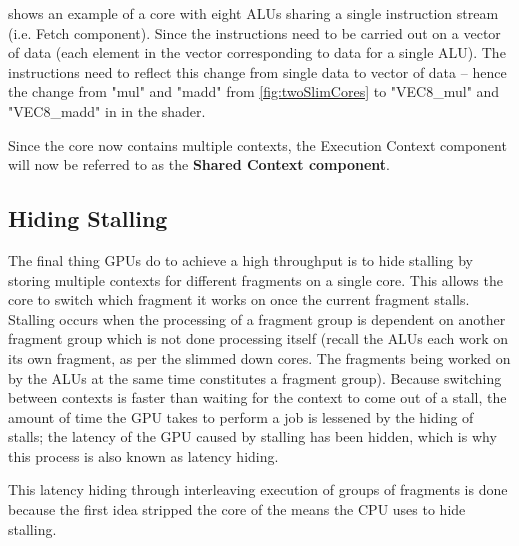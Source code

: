
 shows an example of a core with eight \glspl{ALU} sharing a single instruction stream (i.e. Fetch component).
Since the instructions need to be carried out on a vector of data (each element in the vector corresponding to data for a single \gls{ALU}).
The instructions need to reflect this change from single data to vector of data -- hence the change from "mul" and "madd" from \cref{fig:twoSlimCores} to "VEC8\_mul" and "VEC8\_madd" in  in the shader.

Since the core now contains multiple contexts, the Execution Context component will now be referred to as the \textbf{Shared Context component}.

\subsection{Hiding Stalling}
The final thing \glspl{GPU} do to achieve a high throughput is to hide stalling by storing multiple contexts for different fragments on a single core. 
This allows the core to switch which fragment it works on once the current fragment stalls.
Stalling occurs when the processing of a fragment group is dependent on another fragment group which is not done processing itself (recall the \glspl{ALU} each work on its own fragment, as per the slimmed down cores.
The fragments being worked on by the \glspl{ALU} at the same time constitutes a fragment group).
Because switching between contexts is faster than waiting for the context to come out of a stall, the amount of time the \gls{GPU} takes to perform a job is lessened by the hiding of stalls; the latency of the \gls{GPU} caused by stalling has been hidden, which is why this process is also known as latency hiding.

This latency hiding through interleaving execution of groups of fragments is done because the first idea  stripped the core of the means the \gls{CPU} uses to hide stalling. 



